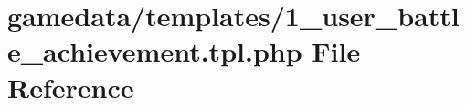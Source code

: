 \hypertarget{1__user__battle__achievement_8tpl_8php}{\section{gamedata/templates/1\+\_\+user\+\_\+battle\+\_\+achievement.tpl.\+php File Reference}
\label{1__user__battle__achievement_8tpl_8php}
}
